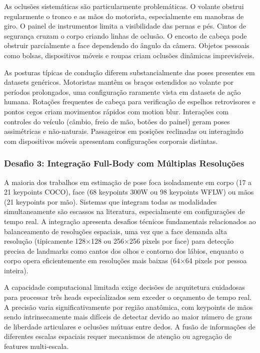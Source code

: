 \documentclass[12pt, a4paper]{article}
\begin{document}
As oclusões sistemáticas são particularmente problemáticas. O volante obstrui regularmente o tronco e as mãos do motorista, especialmente em manobras de giro. O painel de instrumentos limita a visibilidade das pernas e pés. Cintos de segurança cruzam o corpo criando linhas de oclusão. O encosto de cabeça pode obstruir parcialmente a face dependendo do ângulo da câmera. Objetos pessoais como bolsas, dispositivos móveis e roupas criam oclusões dinâmicas imprevisíveis.

As posturas típicas de condução diferem substancialmente das poses presentes em datasets genéricos. Motoristas mantêm os braços estendidos ao volante por períodos prolongados, uma configuração raramente vista em datasets de ação humana. Rotações frequentes de cabeça para verificação de espelhos retrovisores e pontos cegos criam movimentos rápidos com motion blur. Interações com controles do veículo (câmbio, freio de mão, botões do painel) geram poses assimétricas e não-naturais. Passageiros em posições reclinadas ou interagindo com dispositivos móveis apresentam configurações corporais distintas.

\subsubsection{Desafio 3: Integração Full-Body com Múltiplas Resoluções}

A maioria dos trabalhos em estimação de pose foca isoladamente em corpo (17 a 21 keypoints COCO), face (68 keypoints 300W ou 98 keypoints WFLW) ou mãos (21 keypoints por mão). Sistemas que integram todas as modalidades simultaneamente são escassos na literatura, especialmente em configurações de tempo real. A integração apresenta desafios técnicos fundamentais relacionados ao balanceamento de resoluções espaciais, uma vez que a face demanda alta resolução (tipicamente 128×128 ou 256×256 pixels por face) para detecção precisa de landmarks como cantos dos olhos e contorno dos lábios, enquanto o corpo opera eficientemente em resoluções mais baixas (64×64 pixels por pessoa inteira).

A capacidade computacional limitada exige decisões de arquitetura cuidadosas para processar três heads especializados sem exceder o orçamento de tempo real. A precisão varia significativamente por região anatômica, com keypoints de mãos sendo intrinsecamente mais difíceis de detectar devido ao maior número de graus de liberdade articulares e oclusões mútuas entre dedos. A fusão de informações de diferentes escalas espaciais requer mecanismos de atenção ou agregação de features multi-escala.
\end{document}
